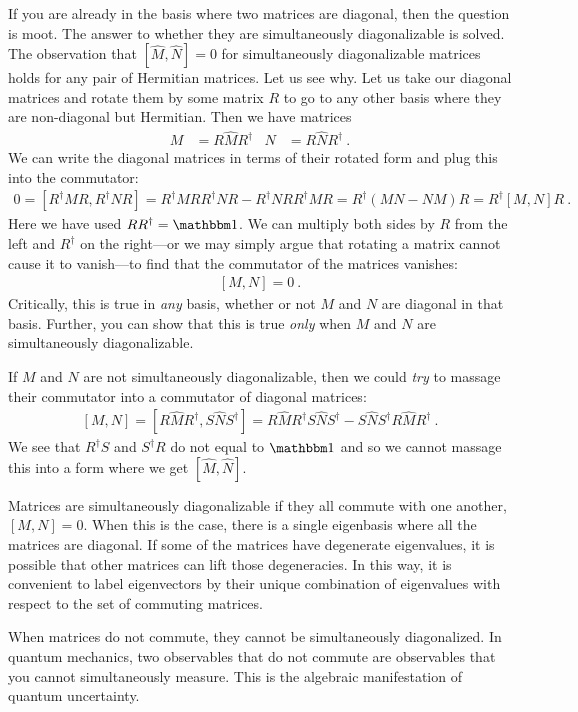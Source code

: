 \documentclass[12pt, oneside]{report}    %
\begin{document}
If you are already in the basis where two matrices are diagonal, then the question is moot. The answer to whether they are simultaneously diagonalizable is solved. The observation that $[\hat M,\hat N] =0 $ for simultaneously diagonalizable matrices holds for any pair of Hermitian matrices. Let us see why. Let us take our diagonal matrices and rotate them by some matrix $R$ to go to any other basis where they are non-diagonal but Hermitian. Then we have matrices
\begin{align}
    M &= R \hat M R^\dag
    &
    N &= R \hat N R^\dag \ .
\end{align}
We can write the diagonal matrices in terms of their rotated form and plug this into the commutator:
\begin{align}
    0=
    \left[ R^\dag M R, R^\dag N R  \right] = 
    R^\dag M R R^\dag N R
    -
    R^\dag N R R^\dag M R
    =
    R^\dag(MN - NM)R
    = R^\dag \left[M,N\right] R \ .
\end{align}
Here we have used $RR^\dag =\one$. We can multiply both sides by $R$ from the left and $R^\dag$ on the right---or we may simply argue that rotating a matrix cannot cause it to vanish---to find that the commutator of the matrices vanishes:
\begin{align}
    \left[M,N\right] = 0 \ .
\end{align}
Critically, this is true in \emph{any} basis, whether or not $M$ and $N$ are diagonal in that basis. Further, you can show that this is true \emph{only} when $M$ and $N$ are simultaneously diagonalizable. 

If $M$ and $N$ are not simultaneously diagonalizable, then we could \emph{try} to massage their commutator into a commutator of diagonal matrices:
\begin{align}
    \left[M,N\right] = 
    \left[R\hat M R^\dag, S\hat N S^\dag\right]
    =
    R \hat M R^\dag S \hat N S^\dag
    -
    S \hat N S^\dag    R \hat M R^\dag  \ .
\end{align}
We see that $R^\dag S$ and $S^\dag R$ do not equal to $\one$ and so we cannot massage this into a form where we get $[\hat M, \hat N]$. 

\begin{bigidea}
Matrices are simultaneously diagonalizable if they all commute with one another, $[M,N] = 0$. When this is the case, there is a single eigenbasis where all the matrices are diagonal. If some of the matrices have degenerate eigenvalues, it is possible that other matrices can lift those degeneracies. In this way, it is convenient to label eigenvectors by their unique combination of eigenvalues with respect to the set of commuting matrices. 

When matrices do not commute, they cannot be simultaneously diagonalized. In quantum mechanics, two observables that do not commute are observables that you cannot simultaneously measure. This is the algebraic manifestation of quantum uncertainty.
\end{bigidea}
\end{document}
